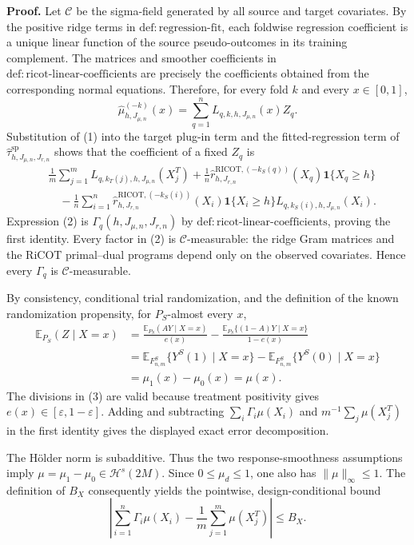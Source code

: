 \textbf{Proof.}
Let \(\mathcal C\) be the sigma-field generated by all source and target covariates. By the positive ridge terms in \(\mathrm{def:regression\text{-}fit}\), each foldwise regression coefficient is a unique linear function of the source pseudo-outcomes in its training complement. The matrices and smoother coefficients in \(\mathrm{def:ricot\text{-}linear\text{-}coefficients}\) are precisely the coefficients obtained from the corresponding normal equations. Therefore, for every fold \(k\) and every \(x\in[0,1]\),
\[
\widehat\mu^{(-k)}_{h,J_{\mu,n}}(x)
=\sum_{q=1}^n L_{q,k,h,J_{\mu,n}}(x)Z_q.
\tag{1}
\]
Substitution of (1) into the target plug-in term and the fitted-regression term of \(\widehat\tau^{\mathrm{sp}}_{h,J_{\mu,n},J_{r,n}}\) shows that the coefficient of a fixed \(Z_q\) is
\[
\begin{aligned}
{}&\frac1m\sum_{j=1}^mL_{q,k_T(j),h,J_{\mu,n}}(X_j^T)
+\frac1n\widehat r^{\mathrm{RICOT},(-k_S(q))}_{h,J_{r,n}}(X_q)\mathbf 1\{X_q\ge h\}\\
&\quad-\frac1n\sum_{i=1}^n
\widehat r^{\mathrm{RICOT},(-k_S(i))}_{h,J_{r,n}}(X_i)\mathbf 1\{X_i\ge h\}
L_{q,k_S(i),h,J_{\mu,n}}(X_i).
\end{aligned}
\tag{2}
\]
Expression (2) is \(\Gamma_q(h,J_{\mu,n},J_{r,n})\) by \(\mathrm{def:ricot\text{-}linear\text{-}coefficients}\), proving the first identity. Every factor in (2) is \(\mathcal C\)-measurable: the ridge Gram matrices and the RiCOT primal--dual programs depend only on the observed covariates. Hence every \(\Gamma_q\) is \(\mathcal C\)-measurable.

By consistency, conditional trial randomization, and the definition of the known randomization propensity, for \(P_S\)-almost every \(x\),
\[
\begin{aligned}
\mathbb E_{P_S}(Z\mid X=x)
&=\frac{\mathbb E_{P_S}(AY\mid X=x)}{e(x)}
-\frac{\mathbb E_{P_S}\{(1-A)Y\mid X=x\}}{1-e(x)}\\
&=\mathbb E_{F^S_{n,m}}\{Y^S(1)\mid X=x\}
-\mathbb E_{F^S_{n,m}}\{Y^S(0)\mid X=x\}\\
&=\mu_1(x)-\mu_0(x)=\mu(x).
\end{aligned}
\tag{3}
\]
The divisions in (3) are valid because treatment positivity gives \(e(x)\in[\varepsilon,1-\varepsilon]\). Adding and subtracting \(\sum_i\Gamma_i\mu(X_i)\) and \(m^{-1}\sum_j\mu(X_j^T)\) in the first identity gives the displayed exact error decomposition.

The H\"older norm is subadditive. Thus the two response-smoothness assumptions imply \(\mu=\mu_1-\mu_0\in\mathcal H^s(2M)\). Since \(0\le\mu_d\le1\), one also has \(\|\mu\|_\infty\le1\). The definition of \(B_X\) consequently yields the pointwise, design-conditional bound
\[
\left|\sum_{i=1}^n\Gamma_i\mu(X_i)-\frac1m\sum_{j=1}^m\mu(X_j^T)\right|\le B_X.
\tag{4}
\]

